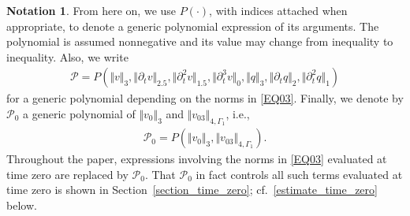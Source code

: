 \documentclass[10pt,reqno]{amsart}
\theoremstyle{plain}
\theoremstyle{definition}
\newtheorem{notation}[theorem]{Notation}
\numberwithin{equation}{section}
\newcommand{\ccP}{\mathscr{P}}
\newcommand{\ccPz}{\mathscr{P}_0}
\newcommand{\Ga}{\Gamma}
\newcommand{\norm}[1]{\Vert#1\Vert}
\begin{document}
\begin{notation}
From here on, we use $P(\cdot)$, with indices attached when appropriate, to denote a 
generic polynomial expression of its arguments. The polynomial is assumed
nonnegative and its value may change from inequality to inequality.
Also, we write
\begin{gather}
\ccP = P( \norm{v}_3,  \norm{\partial_t v}_{2.5}, \norm{\partial^2_t v}_{1.5}, 
\norm{\partial^3_t v}_0,  \norm{q}_3,  \norm{\partial_t q}_{2},
 \norm{\partial^2_t q}_1 )
   \label{EQ04}
\end{gather}
for a generic polynomial depending on the norms in \eqref{EQ03}.
Finally, we denote by $\ccP_0$ a generic polynomial of 
$\norm{v_0}_3$ and 
$\norm{v_{03}}_{4,\Ga_1}$, i.e.,
\begin{gather}
\ccPz = P(\norm{v_0}_3, \norm{ v_{03}}_{4,\Ga_1}).
\nonumber
\end{gather}
Throughout the paper,  expressions involving the norms 
in \eqref{EQ03} evaluated at time zero are replaced by
$\ccP_0$. That $\ccP_0$ in fact controls all such terms evaluated at time zero is
shown in Section~\ref{section_time_zero};
cf.~\eqref{estimate_time_zero} below.
\label{notation_polynomial}
\end{notation}
\end{document}
